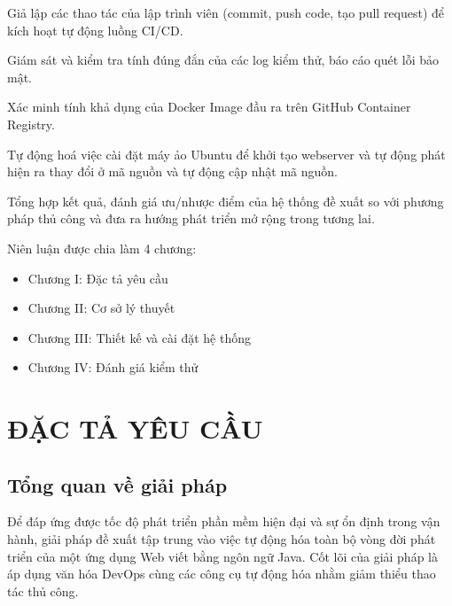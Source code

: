 \documentclass[12pt,a4paper,oneside]{extreport}
\begin{document}
Giả lập các thao tác của lập trình viên (commit, push code, tạo pull request)
để kích hoạt tự động luồng CI/CD.

Giám sát và kiểm tra tính đúng đắn của các log kiểm thử, báo cáo quét lỗi bảo
mật.

Xác minh tính khả dụng của Docker Image đầu ra trên GitHub Container Registry.

Tự động hoá việc cài đặt máy ảo Ubuntu để khởi tạo webserver và tự động phát
hiện ra thay đổi ở mã nguồn và tự động cập nhật mã nguồn.

Tổng hợp kết quả, đánh giá ưu/nhược điểm của hệ thống đề xuất so với phương
pháp thủ công và đưa ra hướng phát triển mở rộng trong tương lai.

Niên luận được chia làm 4 chương:
\begin{itemize}
  \item Chương I: Đặc tả yêu cầu
  \item Chương II: Cơ sở lý thuyết
  \item Chương III: Thiết kế và cài đặt hệ thống
  \item Chương IV: Đánh giá kiểm thử
\end{itemize}

\chapter{ĐẶC TẢ YÊU CẦU}
\label{chap:requirements}
\section{Tổng quan về giải pháp}
Để đáp ứng được tốc độ phát triển phần mềm hiện đại và sự ổn định trong vận
hành, giải pháp đề xuất tập trung vào việc tự động hóa toàn bộ vòng đời phát
triển của một ứng dụng Web viết bằng ngôn ngữ Java. Cốt lõi của giải pháp là áp
dụng văn hóa DevOps cùng các công cụ tự động hóa nhằm giảm thiểu thao tác thủ
công.
\end{document}
